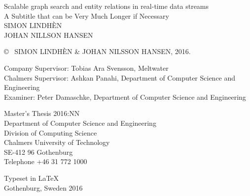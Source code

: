 \newpage
\thispagestyle{plain}
\vspace*{4.5cm}
Scalable graph search and entity relations in real-time data streams\\
A Subtitle that can be Very Much Longer if Necessary\\
SIMON LINDHÈN\\
JOHAN NILLSON HANSEN\setlength{\parskip}{1cm}



\copyright ~ SIMON LINDHÈN \& JOHAN NILSSON HANSEN, 2016. \setlength{\parskip}{1cm}

Company Supervisor: Tobias Ara Svensson, Meltwater\\
Chalmers Supervisor: Ashkan Panahi, Department of Computer Science and Engineering\\
Examiner: Peter Damaschke, Department of Computer Science and Engineering \setlength{\parskip}{1cm}

Master's Thesis 2016:NN\\	%
Department of Computer Science and Engineering\\
Division of Computing Science\\
Chalmers University of Technology\\
SE-412 96 Gothenburg\\
Telephone +46 31 772 1000 \setlength{\parskip}{0.5cm}

\vfill
 \setlength{\parskip}{0.5cm}

Typeset in \LaTeX \\
Gothenburg, Sweden 2016

